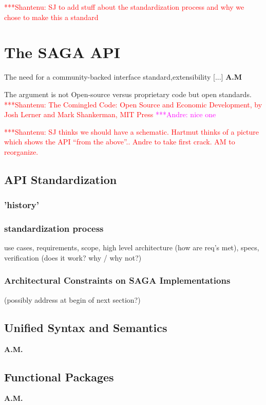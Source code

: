\documentclass[a4paper,10pt]{article}
\newcommand{\amnote}[1]{   {\textcolor{magenta} { ***Andre:    #1 }}}
\newcommand{\jhanote}[1]{  {\textcolor{red}     { ***Shantenu: #1 }}}
\newcommand{\amnote}[1]{}
\newcommand{\jhanote}[1]{}
\begin{document}
 \jhanote{SJ to add stuff about the standardization process and why we chose 
 to make this a standard}
 


 \section{The SAGA API}

  The need for a community-backed interface standard,extensibility
  [...] \textbf{A.M}

  The argument is not Open-source versus proprietary code but open
  standards. \jhanote{The Comingled Code: Open Source and Economic
  Development, by Josh Lerner and Mark Shankerman, MIT
  Press}\amnote{nice one}

  \jhanote{SJ thinks we should have a schematic. Hartmut thinks of a
  picture which shows the API ``from the above''.. Andre to take first
  crack. AM to reorganize.}

  \subsection{API Standardization}

   \subsubsection{'history'}

   \subsubsection{standardization process}
    use cases, requirements, scope, high level architecture (how are
    req's met), specs, verification (does it work?  why / why not?)

   \subsubsection{Architectural Constraints on SAGA Implementations}
    (possibly address at begin of next section?)

  \subsection{Unified Syntax and Semantics}
  \textbf{A.M.}


 
  \subsection{Functional Packages}
  \textbf{A.M.}
\end{document}
